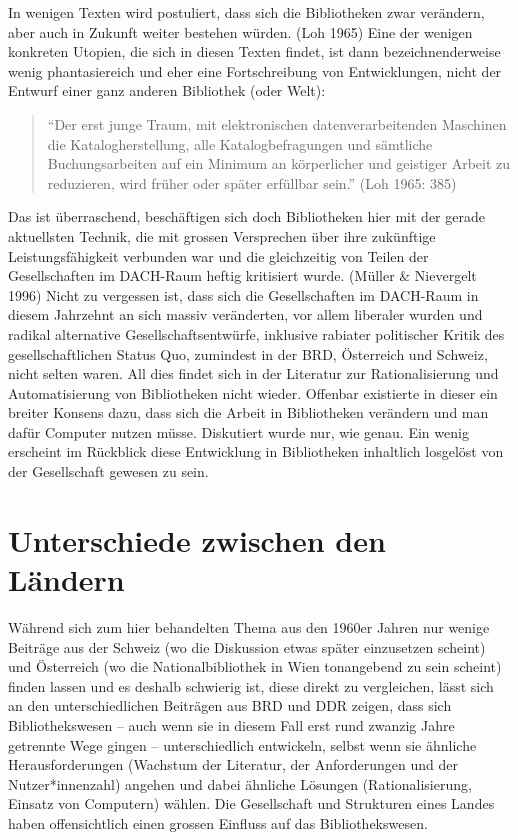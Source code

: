 \documentclass[a4paper,
fontsize=11pt,
oneside,
numbers=noperiodatend,
parskip=half-,
bibliography=totoc,
final
]{scrartcl}
\begin{document}
In wenigen Texten wird postuliert, dass sich die Bibliotheken zwar
verändern, aber auch in Zukunft weiter bestehen würden. (Loh 1965) Eine
der wenigen konkreten Utopien, die sich in diesen Texten findet, ist
dann bezeichnenderweise wenig phantasiereich und eher eine
Fortschreibung von Entwicklungen, nicht der Entwurf einer ganz anderen
Bibliothek (oder Welt):

\begin{quote}
\enquote{Der erst junge Traum, mit elektronischen datenverarbeitenden Maschinen
die Katalogherstellung, alle Katalogbefragungen und sämtliche
Buchungsarbeiten auf ein Minimum an körperlicher und geistiger Arbeit zu
reduzieren, wird früher oder später erfüllbar sein.} (Loh 1965: 385)
\end{quote}

Das ist überraschend, beschäftigen sich doch Bibliotheken hier mit der
gerade aktuellsten Technik, die mit grossen Versprechen über ihre
zukünftige Leistungsfähigkeit verbunden war und die gleichzeitig von
Teilen der Gesellschaften im DACH-Raum heftig kritisiert wurde. (Müller
\& Nievergelt 1996) Nicht zu vergessen ist, dass sich die Gesellschaften
im DACH-Raum in diesem Jahrzehnt an sich massiv veränderten, vor allem
liberaler wurden und radikal alternative Gesellschaftsentwürfe,
inklusive rabiater politischer Kritik des gesellschaftlichen Status Quo,
zumindest in der BRD, Österreich und Schweiz, nicht selten waren. All
dies findet sich in der Literatur zur Rationalisierung und
Automatisierung von Bibliotheken nicht wieder. Offenbar existierte in
dieser ein breiter Konsens dazu, dass sich die Arbeit in Bibliotheken
verändern und man dafür Computer nutzen müsse. Diskutiert wurde nur, wie
genau. Ein wenig erscheint im Rückblick diese Entwicklung in
Bibliotheken inhaltlich losgelöst von der Gesellschaft gewesen zu sein.

\hypertarget{unterschiede-zwischen-den-luxe4ndern}{%
\section{Unterschiede zwischen den
Ländern}\label{unterschiede-zwischen-den-luxe4ndern}}

Während sich zum hier behandelten Thema aus den 1960er Jahren nur wenige
Beiträge aus der Schweiz (wo die Diskussion etwas später einzusetzen
scheint) und Österreich (wo die Nationalbibliothek in Wien tonangebend
zu sein scheint) finden lassen und es deshalb schwierig ist, diese
direkt zu vergleichen, lässt sich an den unterschiedlichen Beiträgen aus
BRD und DDR zeigen, dass sich Bibliothekswesen -- auch wenn sie in
diesem Fall erst rund zwanzig Jahre getrennte Wege gingen --
unterschiedlich entwickeln, selbst wenn sie ähnliche Herausforderungen
(Wachstum der Literatur, der Anforderungen und der Nutzer*innenzahl)
angehen und dabei ähnliche Lösungen (Rationalisierung, Einsatz von
Computern) wählen. Die Gesellschaft und Strukturen eines Landes haben
offensichtlich einen grossen Einfluss auf das Bibliothekswesen.
\end{document}
